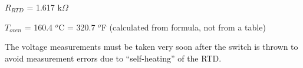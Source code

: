 
$R_{RTD}$ = 1.617 k$\Omega$

\vskip 10pt

$T_{oven}$ = 160.4 $^{o}$C = 320.7 $^{o}$F (calculated from formula, not from a table)

\vskip 10pt

The voltage measurements must be taken very soon after the switch is thrown to avoid measurement errors due to ``self-heating'' of the RTD.










